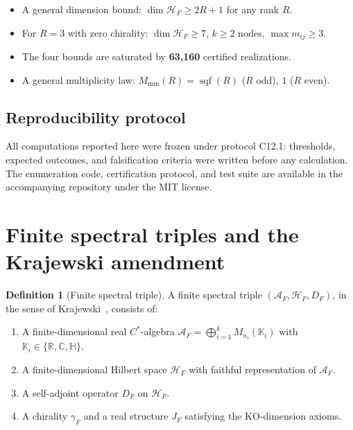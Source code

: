\documentclass[11pt,a4paper]{article}
\theoremstyle{definition}
\newtheorem{definition}[theorem]{Definition}
\begin{document}
\begin{itemize}
    \item[\textbf{T1.}] A general dimension bound: $\dim \mathcal{H}_F \geq 2R + 1$ for any rank $R$.
    \item[\textbf{T2.}] For $R=3$ with zero chirality: $\dim \mathcal{H}_F \geq 7$, $k \geq 2$ nodes, $\max m_{ij} \geq 3$.
    \item[\textbf{T3.}] The four bounds are saturated by \textbf{63,160} certified realizations.
    \item[\textbf{T4.}] A general multiplicity law: $M_{\min}(R) = \operatorname{sqf}(R)$ ($R$ odd), $1$ ($R$ even).
\end{itemize}

\subsection{Reproducibility protocol}

All computations reported here were frozen under protocol C12.1: thresholds, expected outcomes, and falsification criteria were written before any calculation. The enumeration code, certification protocol, and test suite are available in the accompanying repository \cite{portemann2027repo} under the MIT license.

\section{Finite spectral triples and the Krajewski amendment}

\begin{definition}[Finite spectral triple]
A finite spectral triple $(\mathcal{A}_F, \mathcal{H}_F, D_F)$, in the sense of Krajewski~\cite{krajewski1998}, consists of:
\begin{enumerate}
    \item A finite-dimensional real $C^*$-algebra
    $\mathcal{A}_F = \bigoplus_{i=1}^{k} M_{n_i}(\mathbb{K}_i)$
    with $\mathbb{K}_i \in \{\mathbb{R}, \mathbb{C}, \mathbb{H}\}$.
    \item A finite-dimensional Hilbert space $\mathcal{H}_F$ with faithful representation of $\mathcal{A}_F$.
    \item A self-adjoint operator $D_F$ on $\mathcal{H}_F$.
    \item A chirality $\gamma_F$ and a real structure $J_F$ satisfying the KO-dimension axioms.
\end{enumerate}
\end{definition}
\end{document}
